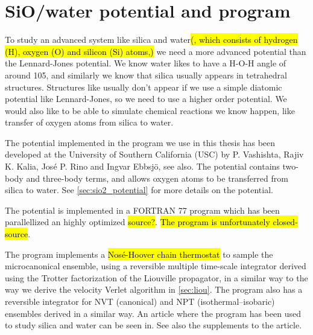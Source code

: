 \chapter{SiO/water potential and program}
To study an advanced system like silica and water\hl{(, which consists of hydrogen (H), oxygen (O) and silicon (Si) atoms,)} we need a more advanced potential than the Lennard-Jones potential. We know water likes to have a H-O-H angle of around 105, and similarly we know that silica usually appears in tetrahedral structures. Structures like usually don't appear if we use a simple diatomic potential like Lennard-Jones, so we need to use a higher order potential. We would also like to be able to simulate chemical reactions we know happen, like transfer of oxygen atoms from silica to water.

The potential implemented in the program we use in this thesis has been developed at the University of Southern California (USC) by P. Vashishta, Rajiv K. Kalia, José P. Rino and Ingvar Ebbsj\"o\cite{vashishta1990interaction}, see also\cite{shekhar2013nanobubble,shekhar2013nanobubble_supplements}. The potential contains two-body and three-body terms, and allows oxygen atoms to be transferred from silica to water. See \cref{sec:sio2_potential} for more details on the potential.

The potential is implemented in a FORTRAN 77 program which has been parallellized an highly optimized \hl{source?}. \hl{The program is unfortunately closed-source}.

The program implements a \hl{Nos\'e-Hoover chain thermostat} to sample the microcanonical ensemble, using a reversible multiple time-scale integrator derived using the Trotter factorization of the Liouville propagator\cite{tuckerman1992reversible}, in a similar way to the way we derive the velocity Verlet algorithm in \cref{sec:liou}. The program also has a reversible integrator for NVT (canonical) and NPT (isothermal–isobaric) ensembles\cite{martyna1996explicit} derived in a similar way. An article where the program has been used to study silica and water can be seen in\cite{shekhar2013nanobubble}. See also the supplements to the article\cite{shekhar2013nanobubble_supplements}.



